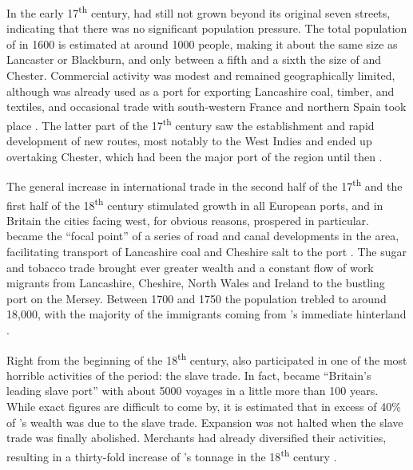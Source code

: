 In the early 17\textsuperscript{th} century,  had still not grown beyond its original seven streets, indicating that there was no significant population pressure.
The total population of  in 1600 is estimated at around 1000 people, making it about the same size as Lancaster or Blackburn, and only between a fifth and a sixth the size of  and Chester.
Commercial activity was modest and remained geographically limited, although  was already used as a port for exporting Lancashire coal, timber, and textiles, and occasional trade with south-western France and northern Spain took place \citeyearpar[cf.][72--76 and 81--84]{kermodeetal2006}.
The latter part of the 17\textsuperscript{th} century saw the establishment and rapid development of new routes, most notably to the West Indies and  ended up overtaking Chester, which had been the major port of the region until then \citep[cf.][107--110]{kermodeetal2006}.

The general increase in international trade in the second half of the 17\textsuperscript{th} and the first half of the 18\textsuperscript{th} century stimulated growth in all European ports, and in Britain the cities facing west, for obvious reasons, prospered in particular.
 became the ``focal point'' of a series of road and canal developments in the area, facilitating transport of Lancashire coal and Cheshire salt to the port \citep[129]{longmore2006}.
The sugar and tobacco trade brought ever greater wealth and a constant flow of work migrants from Lancashire, Cheshire, North Wales and Ireland to the bustling port on the Mersey.
Between 1700 and 1750 the population trebled to around 18,000, with the majority of the immigrants coming from 's immediate hinterland \citep[cf.][114--119 and 169]{longmore2006}.

Right from the beginning of the 18\textsuperscript{th} century,  also participated in one of the most horrible activities of the period: the slave trade.
In fact,  became ``Britain's leading slave port'' with about 5000 voyages in a little more than 100 years.
While exact figures are difficult to come by, it is estimated that in excess of 40\% of 's wealth was due to the slave trade.
Expansion was not halted when the slave trade was finally abolished.
Merchants had already diversified their activities, resulting in a thirty-fold increase of 's tonnage in the 18\textsuperscript{th} century \citep[cf.][131--134 and 137]{longmore2006}.

